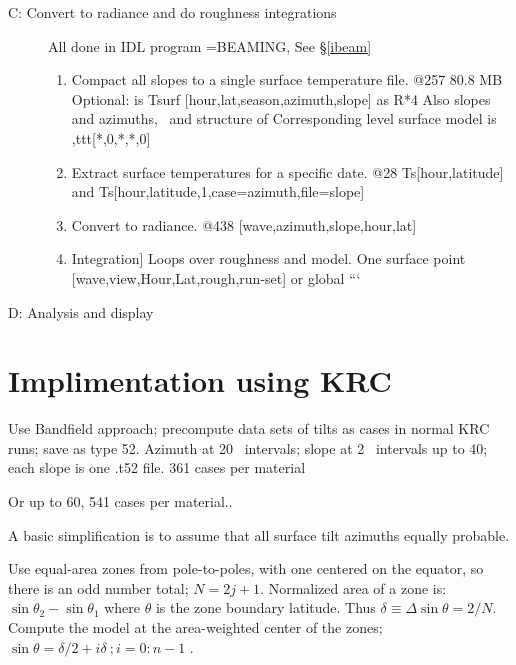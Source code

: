 \documentclass{article}
\begin{document}
\begin{description}
\item [C: Convert to radiance and do roughness integrations] \hspace{1.mm}
All done in IDL program =BEAMING, See \S \ref{ibeam}
\begin{enumerate}    %
\item   Compact all slopes to a single surface temperature file.
  \qi @257  80.8 MB    
   \qiii Optional: 
  \qii {} is Tsurf [hour,lat,season,azimuth,slope] as R*4
\qii Also  slopes and  azimuths, \ and  structure of 
\qi Corresponding level surface model is ,ttt[*,0,*,*,0]
\item Extract surface temperatures for a specific date.
  \qi  @28  Ts[hour,latitude]
 \qi  and    Ts[hour,latitude,1,case=azimuth,file=slope]
\item Convert to radiance.
  \qi  @438  [wave,azimuth,slope,hour,lat] 
\item Integration] Loops over roughness and model.
  \qi One surface point   [wave,view,Hour,Lat,rough,run-set] 
  \qi or global    ```
\qi 
\end{enumerate}

\item [D: Analysis and display] \hspace{1.mm}
\end{description}

\section{Implimentation using KRC}
Use Bandfield approach; precompute data sets of tilts as cases in
normal KRC runs; save as type 52. Azimuth at 20\qd~ intervals; slope at 2\qd~
intervals up to 40\qd; each slope is one .t52 file. 361 cases per material

Or up to 60\qd, 541 cases per material..

A basic simplification is to assume that all surface tilt azimuths equally probable.
 
Use equal-area zones from pole-to-poles, with one centered on the equator, so
there is an odd number total; $N=2j+1$.  Normalized area of a zone is: $\sin
\theta_2 - \sin \theta_1$ where $\theta$ is the zone boundary latitude. Thus
$\delta \equiv \Delta \sin \theta = 2/N $.  Compute the model at the
area-weighted center of the zones; $\sin \theta= \delta/2+i \delta \ ; i=0:n-1$ .
\end{document}
